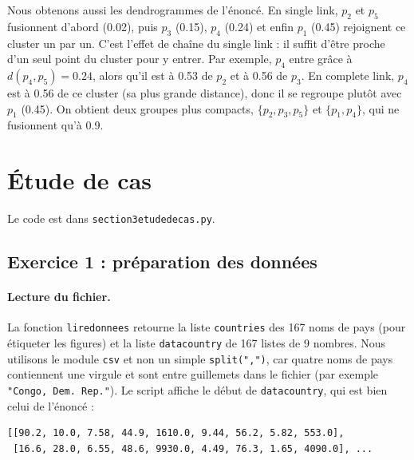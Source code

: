 \documentclass[11pt,a4paper]{article}
\renewcommand{\_}{\underscoreorig\allowbreak}
\begin{document}
Nous obtenons aussi les dendrogrammes de l'énoncé. En single link, $p_2$ et $p_5$ fusionnent d'abord (0.02), puis $p_3$ (0.15), $p_4$ (0.24) et enfin $p_1$ (0.45) rejoignent ce cluster un par un. C'est l'effet de chaîne du single link : il suffit d'être proche d'un seul point du cluster pour y entrer. Par exemple, $p_4$ entre grâce à $d(p_4, p_5) = 0.24$, alors qu'il est à 0.53 de $p_2$ et à 0.56 de $p_3$. En complete link, $p_4$ est à 0.56 de ce cluster (sa plus grande distance), donc il se regroupe plutôt avec $p_1$ (0.45). On obtient deux groupes plus compacts, $\{p_2, p_3, p_5\}$ et $\{p_1, p_4\}$, qui ne fusionnent qu'à 0.9.

\section{Étude de cas}

Le code est dans \texttt{section3\_etude\_de\_cas.py}.

\subsection{Exercice 1 : préparation des données}

\paragraph{Lecture du fichier.} La fonction \texttt{lire\_donnees} retourne la liste \texttt{countries} des 167 noms de pays (pour étiqueter les figures) et la liste \texttt{data\_country} de 167 listes de 9 nombres. Nous utilisons le module \texttt{csv} et non un simple \texttt{split(",")}, car quatre noms de pays contiennent une virgule et sont entre guillemets dans le fichier (par exemple \texttt{"Congo, Dem. Rep."}). Le script affiche le début de \texttt{data\_country}, qui est bien celui de l'énoncé :
\begin{lstlisting}
[[90.2, 10.0, 7.58, 44.9, 1610.0, 9.44, 56.2, 5.82, 553.0],
 [16.6, 28.0, 6.55, 48.6, 9930.0, 4.49, 76.3, 1.65, 4090.0], ...
\end{lstlisting}
\end{document}
